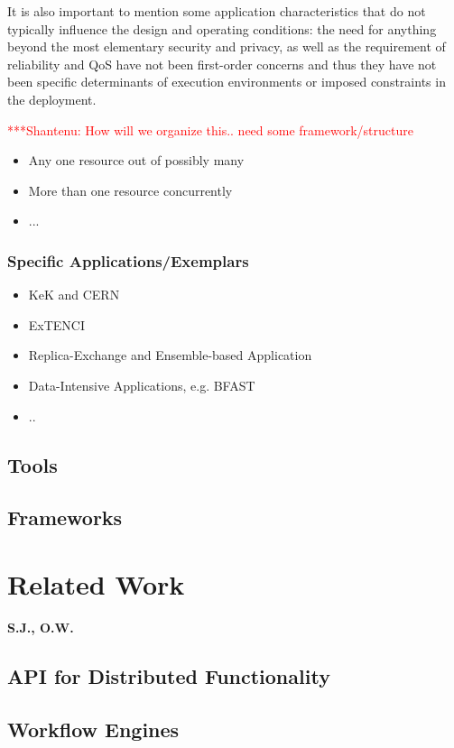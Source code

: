 \documentclass[a4paper,10pt]{article}
\newcommand{\jhanote}[1]{  {\textcolor{red}     { ***Shantenu: #1 }}}
\newcommand{\jhanote}[1]{}
\begin{document}
 It is also important to mention some application characteristics that
 do not typically influence the design and operating conditions: the
 need for anything beyond the most elementary security and privacy, as
 well as the requirement of reliability and QoS have not been
 first-order concerns and thus they have not been specific
 determinants of execution environments or imposed constraints in the
 deployment.

\jhanote{How will we organize this.. need some framework/structure}

\begin{itemize}
\item Any one resource out of possibly many
\item More than one resource concurrently
\item ...
\end{itemize}

\subsubsection{Specific Applications/Exemplars}

\begin{itemize}
\item KeK and CERN
\item ExTENCI
\item Replica-Exchange and Ensemble-based Application
\item Data-Intensive Applications, e.g. BFAST
\item .. 
\end{itemize}


 \subsection{Tools}
 \subsection{Frameworks}

 
\section{Related Work}
 \textbf{S.J., O.W.}

\subsection{API for Distributed Functionality}

\subsection{Workflow Engines}
\end{document}

